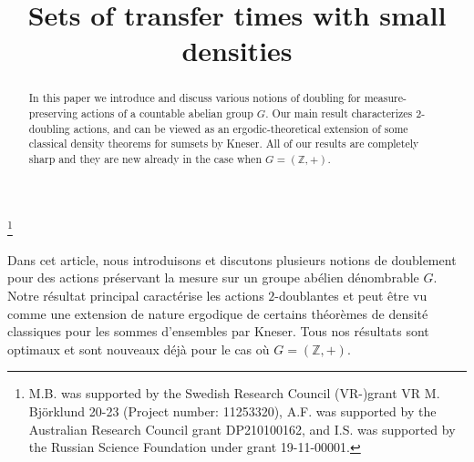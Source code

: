 \documentclass[JEP,XML,SOM,Unicode]{cedram}
\theoremstyle{plain}
\theoremstyle{definition}
\begin{document}
\title{Sets of transfer times with small densities}

\author[\initial{M.} \lastname{Björklund}]{ }
\address{Department of Mathematics, Chalmers University\\
Chalmers Tvärgata 3, SE-412 96 Gothenburg, Sweden}

\author[\initial{A.} \lastname{Fish}]{ }
\address{The School of Mathematics and Statistics, Faculty of Science, The University of Sydney\\
NSW 2006, Sydney, Australia}

\author[\initial{I.} \middlename {D.} \lastname{Shkredov}]{  }
\address{Steklov Mathematical Institute\\
ul. Gubkina 8, 119991 Moscow, Russia}

\thanks{M.B. was supported by the Swedish Research Council (VR-)grant VR M. Björklund 20-23 (Project number: 11253320), A.F. was supported by the Australian Research Council grant DP210100162, and I.S. was supported by the Russian Science Foundation under grant 19-11-00001.}

\begin{abstract}
In this paper we introduce and discuss various notions of doubling for measure-preserving actions of a countable abelian group $G$. Our main result characterizes $2$\nobreakdash-doubling actions, and can be viewed as an ergodic-theoretical extension of some classical density theorems for sumsets by Kneser. All of our results are completely sharp and they are new already in the case when $G = (\mathbb{Z},+)$.
\end{abstract}





\begin{altabstract}
Dans cet article, nous introduisons et discutons plusieurs notions de doublement pour des actions préservant la mesure sur un groupe abélien dénombrable $G$. Notre résultat principal caractérise les actions $2$-doublantes et peut être vu comme une extension de nature ergodique de certains théorèmes de densité classiques pour les sommes d'ensembles par Kneser. Tous nos résultats sont optimaux et sont nouveaux déjà pour le cas où $G = (\mathbb{Z},+)$.
\end{altabstract}
\maketitle
\vspace*{-1.5\baselineskip}
\tableofcontents
\end{document}
